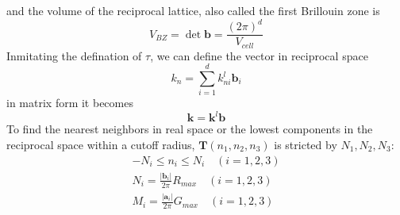 \documentclass[11pt]{article}
\begin{document}
and the volume of the reciprocal lattice, also called the first Brillouin zone is
\begin{equation}
    V_{BZ}=\det{\mathbf{b}}=\frac{{(2\pi)}^d}{V_{cell}}
\end{equation}
Inmitating the defination of $\tau$, we can define the vector in reciprocal space
\begin{equation}
    k_n=\sum_{i=1}^{d}k_{ni}^l\mathbf{b}_i
\end{equation}
in matrix form it becomes
\begin{equation}
    \mathbf{k}=\mathbf{k}^l\mathbf{b}
\end{equation}
To find the nearest neighbors in real space or the lowest components in the reciprocal space within a cutoff radius, $\mathbf{T}(n_1,n_2,n_3)$ is
stricted by $N_1,N_2,N_3$:
\begin{gather}
    -N_i \leq  n_i\leq N_i \quad(i=1,2,3)\\
    N_i=\frac{\lvert\mathbf{b}_i\rvert}{2\pi}R_{max}\quad(i=1,2,3)\\
    M_i=\frac{\lvert\mathbf{a}_i\rvert}{2\pi}G_{max}\quad(i=1,2,3)
\end{gather}
\end{document}
